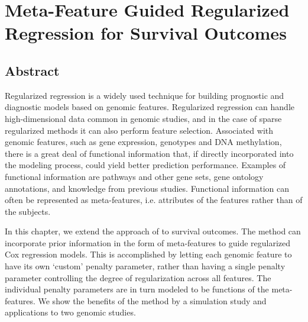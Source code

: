 \chapter{Meta-Feature Guided Regularized Regression for Survival Outcomes}
\label{cha:xtunecox}

\section{Abstract}
Regularized regression is a widely used technique for building prognostic and diagnostic models based on genomic features. Regularized regression can handle high-dimensional data common in genomic studies, and in the case of sparse regularized methods  it can also  perform feature selection. Associated with genomic features, such as gene expression, genotypes and DNA methylation, there is a great deal of functional information that, if directly incorporated into the modeling process, could yield better prediction performance. Examples of functional information are pathways and other gene sets, gene ontology annotations, and knowledge from previous studies. Functional information can often be represented as meta-features, i.e. attributes of the features rather than of the subjects. 

In this chapter, we extend the approach of \cite{zeng2021incorporating} to survival outcomes. The method can incorporate prior information in the form of meta-features to guide regularized Cox regression models. This is accomplished by letting each genomic feature to have its own `custom' penalty parameter, rather than having a single penalty parameter controlling the degree of regularization across all features. The individual penalty parameters are in turn modeled to be functions of the meta-features.  We show the benefits of the method by a simulation study and applications to two genomic studies.  

